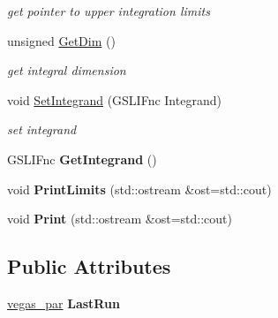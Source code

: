 \begin{DoxyCompactItemize}
\begin{DoxyCompactList}\small\item\em get pointer to upper integration limits \end{DoxyCompactList}\item 
\hypertarget{classIntegral_a6ed296293c2b08c0236481e865f853b7}{unsigned \hyperlink{classIntegral_a6ed296293c2b08c0236481e865f853b7}{Get\-Dim} ()}\label{classIntegral_a6ed296293c2b08c0236481e865f853b7}

\begin{DoxyCompactList}\small\item\em get integral dimension \end{DoxyCompactList}\item 
\hypertarget{classIntegral_ad1732ff730fedb0318db082f664aa195}{void \hyperlink{classIntegral_ad1732ff730fedb0318db082f664aa195}{Set\-Integrand} (G\-S\-L\-I\-Fnc Integrand)}\label{classIntegral_ad1732ff730fedb0318db082f664aa195}

\begin{DoxyCompactList}\small\item\em set integrand \end{DoxyCompactList}\item 
\hypertarget{classIntegral_a434ffd1525d0110a9e0d472721f51a32}{G\-S\-L\-I\-Fnc {\bfseries Get\-Integrand} ()}\label{classIntegral_a434ffd1525d0110a9e0d472721f51a32}

\item 
\hypertarget{classIntegral_a318a1ac7c8715d403046764afc47e66c}{void {\bfseries Print\-Limits} (std\-::ostream \&ost=std\-::cout)}\label{classIntegral_a318a1ac7c8715d403046764afc47e66c}

\item 
\hypertarget{classIntegral_ac16a7e08428f7b1879638a9a2981aea6}{void {\bfseries Print} (std\-::ostream \&ost=std\-::cout)}\label{classIntegral_ac16a7e08428f7b1879638a9a2981aea6}

\end{DoxyCompactItemize}
\subsection*{Public Attributes}
\begin{DoxyCompactItemize}
\item 
\hypertarget{classIntegral_a9d7c0d25642cec0937e5fae17b58b5bc}{\hyperlink{classvegas__par}{vegas\-\_\-par} {\bfseries Last\-Run}}\label{classIntegral_a9d7c0d25642cec0937e5fae17b58b5bc}

\end{DoxyCompactItemize}


